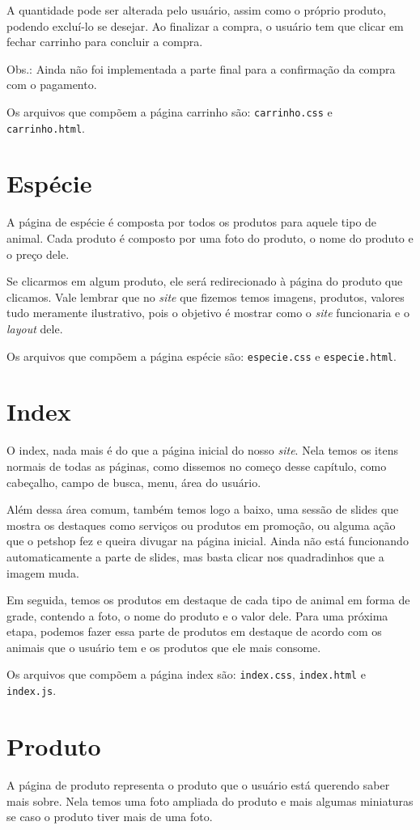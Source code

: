 A quantidade pode ser alterada pelo usuário, assim como o próprio produto, podendo excluí-lo se
desejar. Ao finalizar a compra, o usuário tem que clicar em fechar carrinho para concluir a compra.

Obs.: Ainda não foi implementada a parte final para a confirmação da compra com o pagamento.

Os arquivos que compõem a página carrinho são: \texttt{carrinho.css} e \texttt{carrinho.html}.

\section{Espécie}
A página de espécie é composta por todos os produtos para aquele tipo de animal. Cada produto é
composto por uma foto do produto, o nome do produto e o preço dele.

Se clicarmos em algum produto, ele será redirecionado à página do produto que clicamos. Vale lembrar
que no \emph{site} que fizemos temos imagens, produtos, valores tudo meramente ilustrativo, pois o
objetivo é mostrar como o \emph{site} funcionaria e o \emph{layout} dele.

Os arquivos que compõem a página espécie são: \texttt{especie.css} e \texttt{especie.html}.

\section{Index}
O index, nada mais é do que a página inicial do nosso \emph{site}. Nela temos os itens normais de todas as
páginas, como dissemos no começo desse capítulo, como cabeçalho, campo de busca, menu, área do usuário.

Além dessa área comum, também temos logo a baixo, uma sessão de slides que mostra os destaques como
serviços ou produtos em promoção, ou alguma ação que o petshop fez e queira divugar na página inicial.
Ainda não está funcionando automaticamente a parte de slides, mas basta clicar nos quadradinhos que a
imagem muda.

Em seguida, temos os produtos em destaque de cada tipo de animal em forma de grade, contendo a foto,
o nome do produto e o valor dele. Para uma próxima etapa, podemos fazer essa parte de produtos em
destaque de acordo com os animais que o usuário tem e os produtos que ele mais consome.

Os arquivos que compõem a página index são: \texttt{index.css}, \texttt{index.html} e
\texttt{index.js}.

\section{Produto}
A página de produto representa o produto que o usuário está querendo saber mais sobre. Nela
temos uma foto ampliada do produto e mais algumas miniaturas se caso o produto tiver mais de
uma foto.

